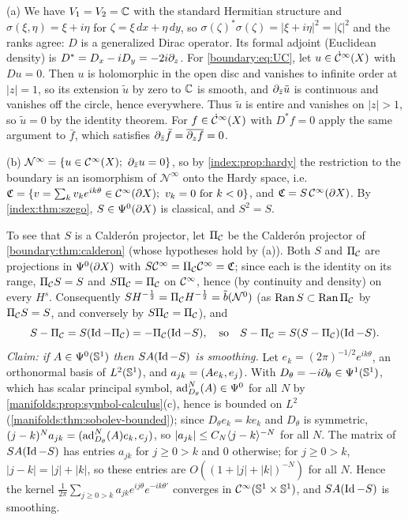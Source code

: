 (a) We have $V_1=V_2=\mathbb{C}$ with the standard Hermitian structure and
$\sigma(\xi,\eta)=\xi+i\eta$ for $\zeta=\xi\,dx+\eta\,dy$, so
$\sigma(\zeta)^*\sigma(\zeta)=|\xi+i\eta|^2=|\zeta|^2$ and the ranks agree: $D$ is a
generalized Dirac operator. Its formal adjoint (Euclidean density) is
$D^*=D_x-iD_y=-2i\partial_z$. For \eqref{boundary:eq:UC}, let $u\in\dot{\mathcal{C}}^\infty(X)$ with $Du=0$. Then $u$
is holomorphic in the open disc and vanishes to infinite order at $|z|=1$, so its extension
$\tilde u$ by zero to $\mathbb{C}$ is smooth, and $\partial_{\bar z}\tilde u$ is continuous and vanishes
off the circle, hence everywhere. Thus $\tilde u$ is entire and vanishes on $|z|>1$, so
$\tilde u=0$ by the identity theorem. For $f\in\dot{\mathcal{C}}^\infty(X)$ with $D^*f=0$ apply the same
argument to $\bar f$, which satisfies $\partial_{\bar z}\bar f=\overline{\partial_zf}=0$.

(b) $\mathcal N^\infty=\{u\in\CI(X);\ \pa_{\bar z}u=0\}$, so by \cref{index:prop:hardy}
the restriction to the boundary is an isomorphism of $\mathcal{N}^\infty$ onto the Hardy
space, i.e.\ $\Cau=\{v=\sum_kv_ke^{ik\theta}\in\CI(\pa X);\ v_k=0\ \text{for}\ k<0\}$, and
$\mathfrak{C}=S\,\mathcal{C}^\infty(\partial X)$. By \cref{index:thm:szego}, $S\in\Psi^{0}(\partial X)$ is classical, and
$S^2=S$.

To see that $S$ is a Calder\'on projector, let $\Pi_{\mathcal{C}}$ be the Calder\'on projector of
\cref{boundary:thm:calderon} (whose hypotheses hold by (a)). Both $S$ and $\Pi_{\mathcal{C}}$ are
projections in $\Psi^{0}(\partial X)$ with $S\mathcal{C}^\infty=\Pi_{\mathcal{C}}\mathcal{C}^\infty=\mathfrak{C}$; since each is the identity on
its range, $\Pi_{\mathcal{C}} S=S$ and $S\Pi_{\mathcal{C}}=\Pi_{\mathcal{C}}$ on $\mathcal{C}^\infty$, hence (by continuity and density) on every
$H^s$. Consequently $S H^{-\frac12}=\Pi_{\mathcal{C}} H^{-\frac12}=\tilde b(\mathcal{N}^0)$ (as
$\operatorname{Ran} S\subset\operatorname{Ran}\Pi_{\mathcal{C}}$ by $\Pi_{\mathcal{C}} S=S$, and conversely by $S\Pi_{\mathcal{C}}=\Pi_{\mathcal{C}}$), and
\begin{equation*}
S-\Pi_{\mathcal{C}}=S(\operatorname{Id}-\Pi_{\mathcal{C}})=-\Pi_{\mathcal{C}}(\operatorname{Id}-S),\quad\text{so}\quad S-\Pi_{\mathcal{C}}=S(S-\Pi_{\mathcal{C}})(\operatorname{Id}-S).
\end{equation*}
\emph{Claim: if $A\in\Psi^{0}(\mathbb{S}^1)$ then $SA(\operatorname{Id}-S)$ is smoothing.} Let
$e_k=(2\pi)^{-1/2}e^{ik\theta}$, an orthonormal basis of $L^2(\mathbb{S}^1)$, and
$a_{jk}=( Ae_k, e_j)$. With $D_\theta=-i\partial_\theta\in\Psi^{1}(\mathbb{S}^1)$, which has
scalar principal symbol, $\operatorname{ad}_{D_\theta}^N(A)\in\Psi^{0}$ for all $N$ by
\cref{manifolds:prop:symbol-calculus}(c), hence is bounded on $L^2$
(\cref{manifolds:thm:sobolev-bounded}); since $D_\theta e_k=ke_k$ and $D_\theta$ is
symmetric, $(j-k)^Na_{jk}=( \operatorname{ad}^N_{D_\theta}(A)e_k, e_j)$, so
$|a_{jk}|\le C_N\langle j-k\rangle^{-N}$ for all $N$. The matrix of $SA(\operatorname{Id}-S)$ has entries $a_{jk}$
for $j\ge0>k$ and $0$ otherwise; for $j\ge0>k$, $|j-k|=|j|+|k|$, so these entries are
$O((1+|j|+|k|)^{-N})$ for all $N$. Hence the kernel $\frac1{2\pi}\sum_{j\ge0>k}a_{jk}
e^{ij\theta}e^{-ik\theta'}$ converges in $\mathcal{C}^\infty(\mathbb{S}^1\times\mathbb{S}^1)$, and $SA(\operatorname{Id}-S)$
is smoothing.

